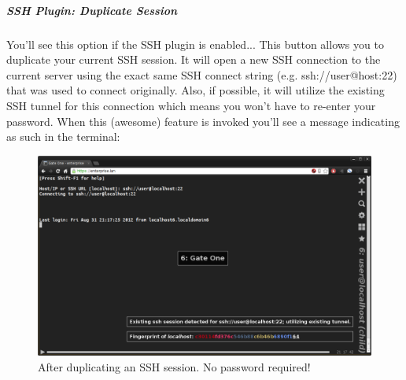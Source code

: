\documentclass[letterpaper,10pt,openany]{sphinxmanual}
\begin{document}
\subparagraph{SSH Plugin: Duplicate Session}
\label{Applications/terminal/userguide:ssh-plugin-duplicate-session}
You'll see this option if the SSH plugin is enabled...  This button allows you to duplicate your current SSH session.  It will open a new SSH connection to the current server using the exact same SSH connect string (e.g. ssh://user@host:22) that was used to connect originally.  Also, if possible, it will utilize the existing SSH tunnel for this connection which means you won't have to re-enter your password.  When this (awesome) feature is invoked you'll see a message indicating as such in the terminal:
\begin{figure}[htbp]
\centering
\capstart

\includegraphics{gateone_second_session_no_password.png}
\caption{After duplicating an SSH session.  No password required!}\end{figure}
\end{document}
